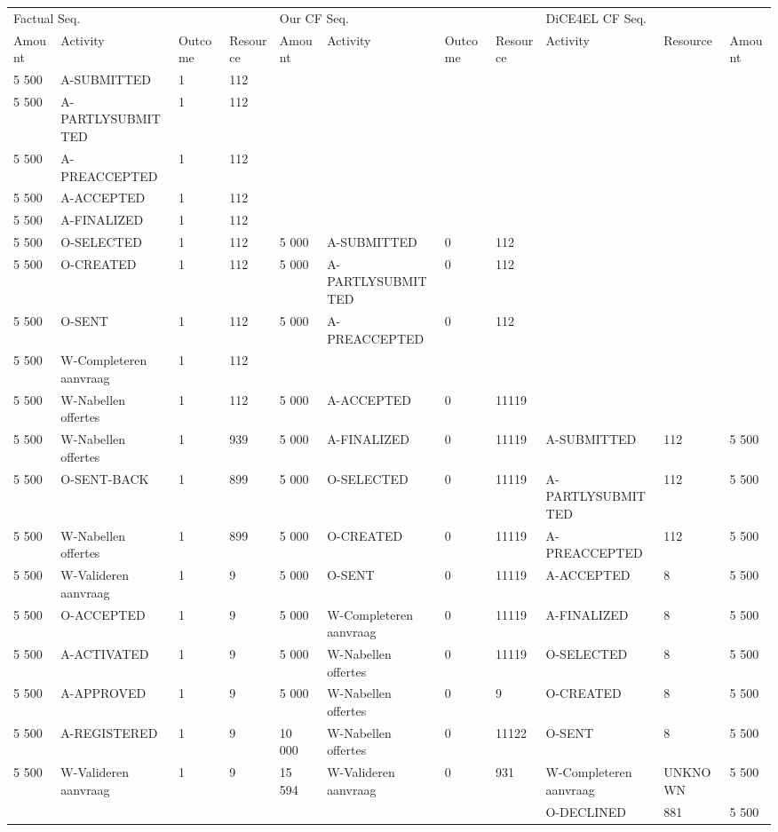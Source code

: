 \begin{tabular}{lllllllllll}
\toprule
\multicolumn{4}{l}{Factual Seq.} & \multicolumn{4}{l}{Our CF Seq.} & \multicolumn{3}{l}{DiCE4EL CF Seq.} \\
Amount & Activity & Outcome & Resource & Amount & Activity & Outcome & Resource & Activity & Resource & Amount \\
\midrule
5 500 & A-SUBMITTED & 1 & 112 &  &  &  &  &  &  &  \\
5 500 & A-PARTLYSUBMITTED & 1 & 112 &  &  &  &  &  &  &  \\
5 500 & A-PREACCEPTED & 1 & 112 &  &  &  &  &  &  &  \\
5 500 & A-ACCEPTED & 1 & 112 &  &  &  &  &  &  &  \\
5 500 & A-FINALIZED & 1 & 112 &  &  &  &  &  &  &  \\
5 500 & O-SELECTED & 1 & 112 & 5 000 & A-SUBMITTED & 0 & 112 &  &  &  \\
5 500 & O-CREATED & 1 & 112 & 5 000 & A-PARTLYSUBMITTED & 0 & 112 &  &  &  \\
5 500 & O-SENT & 1 & 112 & 5 000 & A-PREACCEPTED & 0 & 112 &  &  &  \\
5 500 & W-Completeren aanvraag & 1 & 112 &  &  &  &  &  &  &  \\
5 500 & W-Nabellen offertes & 1 & 112 & 5 000 & A-ACCEPTED & 0 & 11119 &  &  &  \\
5 500 & W-Nabellen offertes & 1 & 939 & 5 000 & A-FINALIZED & 0 & 11119 & A-SUBMITTED & 112 & 5 500 \\
5 500 & O-SENT-BACK & 1 & 899 & 5 000 & O-SELECTED & 0 & 11119 & A-PARTLYSUBMITTED & 112 & 5 500 \\
5 500 & W-Nabellen offertes & 1 & 899 & 5 000 & O-CREATED & 0 & 11119 & A-PREACCEPTED & 112 & 5 500 \\
5 500 & W-Valideren aanvraag & 1 & 9 & 5 000 & O-SENT & 0 & 11119 & A-ACCEPTED & 8 & 5 500 \\
5 500 & O-ACCEPTED & 1 & 9 & 5 000 & W-Completeren aanvraag & 0 & 11119 & A-FINALIZED & 8 & 5 500 \\
5 500 & A-ACTIVATED & 1 & 9 & 5 000 & W-Nabellen offertes & 0 & 11119 & O-SELECTED & 8 & 5 500 \\
5 500 & A-APPROVED & 1 & 9 & 5 000 & W-Nabellen offertes & 0 & 9 & O-CREATED & 8 & 5 500 \\
5 500 & A-REGISTERED & 1 & 9 & 10 000 & W-Nabellen offertes & 0 & 11122 & O-SENT & 8 & 5 500 \\
5 500 & W-Valideren aanvraag & 1 & 9 & 15 594 & W-Valideren aanvraag & 0 & 931 & W-Completeren aanvraag & UNKNOWN & 5 500 \\
 &  &  &  &  &  &  &  & O-DECLINED & 881 & 5 500 \\
\bottomrule
\end{tabular}
